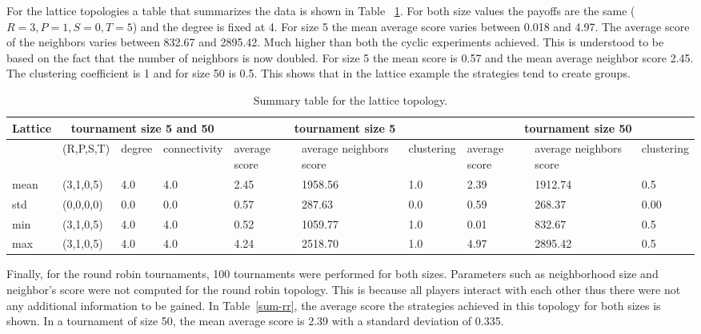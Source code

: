For the lattice topologies a table that summarizes the data is shown in Table
~\ref{sum-lattice}. For both size values the payoffs are the same (\(R=3, P=1, S=0, T=5\))
and the degree is fixed at 4. For size 5 the mean average score
varies between 0.018 and 4.97. The average score of the neighbors varies between
832.67 and 2895.42. Much higher than both the cyclic experiments achieved. This
is understood to be based on the fact that the number of neighbors is now doubled.
For size 5 the mean score is 0.57 and the mean average neighbor score 2.45.
The clustering coefficient is 1 and for size 50 is 0.5.
This shows that in the lattice example the strategies tend to create groups.

\begin{table}[!hbtp]
\centering
\begin{adjustbox}{width=1\textwidth}
\small
\begin{tabular}{@{}|l|l|l|l|l|l|l|l|l|l|@{}}
\toprule
Lattice & \multicolumn{3}{c|}{tournament size 5 and 50} & \multicolumn{3}{c|}{tournament size 5} & \multicolumn{3}{c|}{tournament size 50}                            \\ \midrule
       & (R,P,S,T) & degree & connectivity & average score & average neighbors score & clustering & average score & average neighbors score & clustering \\ \midrule
mean   & (3,1,0,5) & 4.0    & 4.0          & 2.45      & 1958.56           & 1.0        & 2.39      & 1912.74             & 0.5        \\ \midrule
std    & (0,0,0,0) & 0.0    & 0.0          & 0.57      & 287.63            & 0.0        & 0.59      & 268.37              & 0.00       \\ \midrule
min    & (3,1,0,5) & 4.0    & 4.0          & 0.52      & 1059.77           & 1.0        & 0.01      & 832.67              & 0.5        \\ \midrule
max    & (3,1,0,5) & 4.0    & 4.0          & 4.24     & 2518.70            & 1.0        & 4.97      & 2895.42             & 0.5        \\ \bottomrule
\end{tabular}
\end{adjustbox}
\caption{Summary table for the lattice topology.}
\label{sum-lattice}
\end{table}


Finally, for the round robin tournaments, 100 tournaments were performed for both
sizes. Parameters such as neighborhood size and neighbor's score
were not computed for the round robin topology. This is because all players
interact with each other thus there were not any additional information to be
gained. In Table~\ref{sum-rr}, the average score the strategies achieved
in this topology for both sizes is shown. In a tournament of size 50, the mean average
score is 2.39 with a standard deviation of 0.335.

